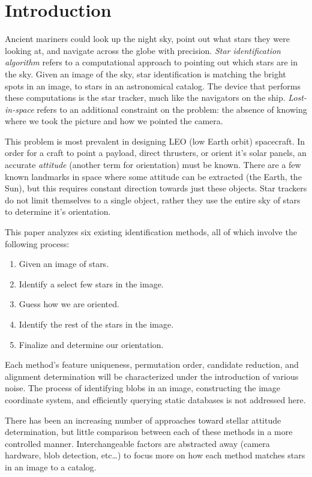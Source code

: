\section{Introduction}\label{sec:introduction}
Ancient mariners could look up the night sky, point out what stars they were looking at, and navigate across the globe
with precision.
\textit{Star identification algorithm} refers to a computational approach to pointing out which stars
are in the sky.
Given an image of the sky, star identification is matching the bright spots in an image, to stars in an astronomical
catalog.
The device that performs these computations is the star tracker, much like the navigators on the ship.
\textit{Lost-in-space} refers to an additional constraint on the problem: the absence of knowing where we took
the picture and how we pointed the camera.

This problem is most prevalent in designing LEO (low Earth orbit) spacecraft.
In order for a craft to point a payload, direct thrusters, or orient it's solar panels, an accurate
\textit{attitude} (another term for orientation) must be known.
There are a few known landmarks in space where some attitude can be extracted (the Earth, the Sun), but this
requires constant direction towards just these objects.
Star trackers do not limit themselves to a single object, rather they use the entire sky of stars to determine it's
orientation.

This paper analyzes six existing identification methods, all of which involve the following process:
\begin{enumerate}
    \item Given an image of stars.
    \item Identify a select few stars in the image.
    \item Guess how we are oriented.
    \item Identify the rest of the stars in the image.
    \item Finalize and determine our orientation.
\end{enumerate}

Each method's feature uniqueness, permutation order, candidate reduction, and alignment determination will be
characterized under the introduction of various noise.
The process of identifying blobs in an image, constructing the image coordinate system, and efficiently querying
static databases is not addressed here.

There has been an increasing number of approaches toward stellar attitude determination, but little comparison between
each of these methods in a more controlled manner.
Interchangeable factors are abstracted away (camera hardware, blob detection, etc\ldots) to focus more on how each
method matches stars in an image to a catalog.